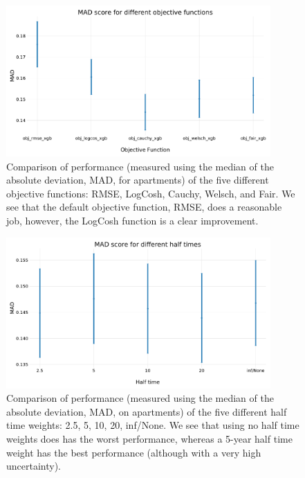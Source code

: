 \documentclass[a4paper, twoside, nobib]{tufte-book}
\begin{document}
\begin{figure}
  \includegraphics[width=0.9\textwidth, trim=0 35 0 40, clip]{figures/housing/Ejerlejlighed_v18_cut_all_Ncols_all_MAD_gridsearch_obj.pdf}
  \caption[Comparison of different objective functions]
          {Comparison of performance (measured using the median of the absolute deviation, MAD, for apartments) of the five different objective functions: RMSE, LogCosh, Cauchy, Welsch, and Fair. We see that the default objective function, RMSE, does a reasonable job, however, the LogCosh function is a clear improvement.
          } 
  \label{fig:h:objective_functions_performance}
\end{figure}



\begin{figure}
  \includegraphics[width=0.9\textwidth, trim=0 0 0 40, clip]{figures/housing/Ejerlejlighed_v18_cut_all_Ncols_all_MAD_gridsearch_half.pdf}
  \caption[Comparison of different half times weights]
          {Comparison of performance (measured using the median of the absolute deviation, MAD, on apartments) of the five different half time weights: 2.5, 5, 10, 20, inf/None. We see that using no half time weights does has the worst performance, whereas a 5-year half time weight has the best performance (although with a very high uncertainty).
          } 
  \label{fig:h:half_time_performance}
\end{figure}
\end{document}
